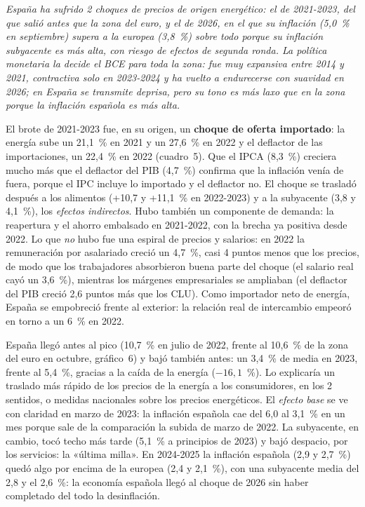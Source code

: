 \begin{examen}
\textit{España ha sufrido 2 choques de precios de origen energético: el de 2021-2023, del que salió antes que la zona del euro, y el de 2026, en el que su inflación (5,0~\% en septiembre) supera a la europea (3,8~\%) sobre todo porque su inflación subyacente es más alta, con riesgo de efectos de segunda ronda. La política monetaria la decide el BCE para toda la zona: fue muy expansiva entre 2014 y 2021, contractiva solo en 2023-2024 y ha vuelto a endurecerse con suavidad en 2026; en España se transmite deprisa, pero su tono es más laxo que en la zona porque la inflación española es más alta.}

El brote de 2021-2023 fue, en su origen, un \textbf{choque de oferta importado}: la energía sube un 21,1~\% en 2021 y un 27,6~\% en 2022 y el deflactor de las importaciones, un 22,4~\% en 2022 (cuadro~5). Que el IPCA (8,3~\%) creciera mucho más que el deflactor del PIB (4,7~\%) confirma que la inflación venía de fuera, porque el IPC incluye lo importado y el deflactor no. El choque se trasladó después a los alimentos (+10,7 y +11,1~\% en 2022-2023) y a la subyacente (3,8 y 4,1~\%), los \emph{efectos indirectos}. Hubo también un componente de demanda: la reapertura y el ahorro embalsado en 2021-2022, con la brecha ya positiva desde 2022. Lo que \emph{no} hubo fue una espiral de precios y salarios: en 2022 la remuneración por asalariado creció un 4,7~\%, casi 4 puntos menos que los precios, de modo que los trabajadores absorbieron buena parte del choque (el salario real cayó un 3,6~\%), mientras los márgenes empresariales se ampliaban (el deflactor del PIB creció 2,6 puntos más que los CLU). Como importador neto de energía, España se empobreció frente al exterior: la relación real de intercambio empeoró en torno a un 6~\% en 2022.

España llegó antes al pico (10,7~\% en julio de 2022, frente al 10,6~\% de la zona del euro en octubre, gráfico~6) y bajó también antes: un 3,4~\% de media en 2023, frente al 5,4~\%, gracias a la caída de la energía ($-16{,}1$~\%). Lo explicaría un traslado más rápido de los precios de la energía a los consumidores, en los 2 sentidos, o medidas nacionales sobre los precios energéticos. El \emph{efecto base} se ve con claridad en marzo de 2023: la inflación española cae del 6,0 al 3,1~\% en un mes porque sale de la comparación la subida de marzo de 2022. La subyacente, en cambio, tocó techo más tarde (5,1~\% a principios de 2023) y bajó despacio, por los servicios: la «última milla». En 2024-2025 la inflación española (2,9 y 2,7~\%) quedó algo por encima de la europea (2,4 y 2,1~\%), con una subyacente media del 2,8 y el 2,6~\%: la economía española llegó al choque de 2026 sin haber completado del todo la desinflación.


\end{examen}
